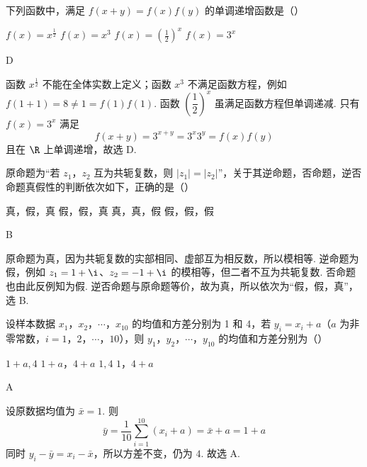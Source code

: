 \begin{problem}
下列函数中，满足 \(f(x + y) = f(x)f(y)\) 的单调递增函数是（\quad）

\choices
    {\(f(x) = x^{\frac{1}{2}}\)}
    {\(f(x) = x^{3}\)}
    {\(f(x) = \left(\frac{1}{2}\right)^{x}\)}
    {\(f(x) = 3^{x}\)}
\end{problem}

\begin{answer}
D
\end{answer}

\begin{solution}
函数 \(x^{\frac12}\) 不能在全体实数上定义；函数 \(x^{3}\) 不满足函数方程，例如 \(f(1+1)=8\ne1=f(1)f(1)\). 函数 \(\left(\dfrac12\right)^x\) 虽满足函数方程但单调递减. 只有 \(f(x)=3^x\) 满足
\[
f(x+y)=3^{x+y}=3^x3^y=f(x)f(y)
\]
且在 \(\R\) 上单调递增，故选 D.
\end{solution}

\begin{problem}
原命题为“若 \(z_{1}\)，\(z_{2}\) 互为共轭复数，则 \(|z_{1}| = |z_{2}|\)”，关于其逆命题，否命题，逆否命题真假性的判断依次如下，正确的是（\quad）

\choices
    {真，假，真}
    {假，假，真}
    {真，真，假}
    {假，假，假}
\end{problem}

\begin{answer}
B
\end{answer}

\begin{solution}
原命题为真，因为共轭复数的实部相同、虚部互为相反数，所以模相等. 逆命题为假，例如 \(z_1=1+\i\)、\(z_2=-1+\i\) 的模相等，但二者不互为共轭复数. 否命题也由此反例知为假. 逆否命题与原命题等价，故为真，所以依次为“假，假，真”，选 B.
\end{solution}

\begin{problem}
设样本数据 \(x_{1}\)，\(x_{2}\)，\(\cdots\)，\(x_{10}\) 的均值和方差分别为 1 和 4，若 \(y_{i} = x_{i} + a\)（\(a\) 为非零常数，\(i = 1\)，\(2\)，\(\cdots\)，\(10\)），则 \(y_{1}\)，\(y_{2}\)，\(\cdots\)，\(y_{10}\) 的均值和方差分别为（\quad）

\choices
    {\(1 + a, 4\)}
    {\(1 + a\)，\(4 + a\)}
    {\(1, 4\)}
    {\(1\)，\(4 + a\)}
\end{problem}

\begin{answer}
A
\end{answer}

\begin{solution}
设原数据均值为 \(\bar{x}=1\). 则
\[
\bar{y}=\frac{1}{10}\sum_{i=1}^{10}(x_i+a)=\bar{x}+a=1+a
\]
同时 \(y_i-\bar{y}=x_i-\bar{x}\)，所以方差不变，仍为 \(4\). 故选 A.
\end{solution}

